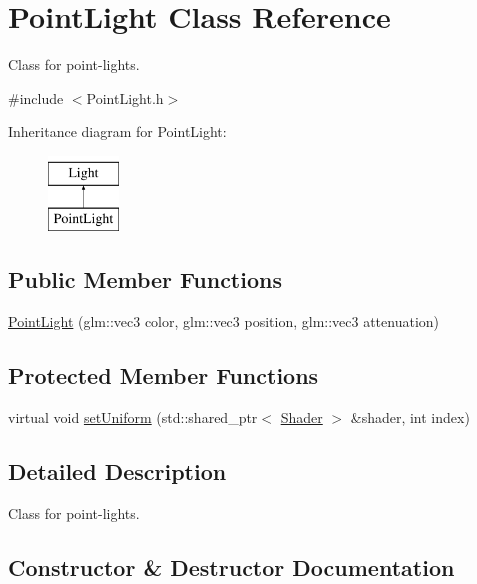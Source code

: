 \hypertarget{class_point_light}{}\section{Point\+Light Class Reference}
\label{class_point_light}


Class for point-\/lights.  




{\ttfamily \#include $<$Point\+Light.\+h$>$}

Inheritance diagram for Point\+Light\+:\begin{figure}[H]
\begin{center}
\leavevmode
\includegraphics[height=2.000000cm]{class_point_light}
\end{center}
\end{figure}
\subsection*{Public Member Functions}
\begin{DoxyCompactItemize}
\item 
\mbox{\hyperlink{class_point_light_a6432222ee0719ab7f38547ee576f4cca}{Point\+Light}} (glm\+::vec3 color, glm\+::vec3 position, glm\+::vec3 attenuation)
\end{DoxyCompactItemize}
\subsection*{Protected Member Functions}
\begin{DoxyCompactItemize}
\item 
virtual void \mbox{\hyperlink{class_point_light_a846794e557d5820c316f3ace8d2b5003}{set\+Uniform}} (std\+::shared\+\_\+ptr$<$ \mbox{\hyperlink{class_shader}{Shader}} $>$ \&shader, int index)
\end{DoxyCompactItemize}


\subsection{Detailed Description}
Class for point-\/lights. 



\subsection{Constructor \& Destructor Documentation}
\mbox{\label{class_point_light_a6432222ee0719ab7f38547ee576f4cca}} 
